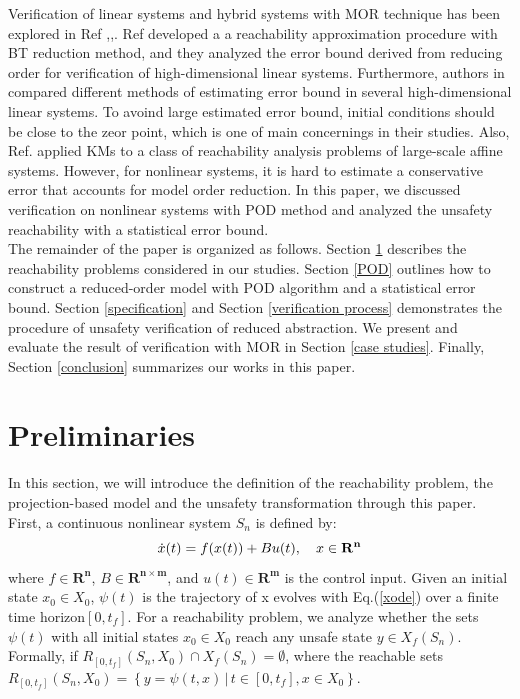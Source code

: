 \documentclass[runningheads,a4paper]{llncs}
\theoremstyle{definition}
\theoremstyle{plain}
\begin{document}
Verification of linear systems and hybrid systems with MOR technique has been explored in Ref \cite{1386733},\cite{Han2006},\cite{Tran2017}. Ref \cite{1386733} developed a a reachability approximation procedure with BT reduction method, and they analyzed the error bound derived from reducing order for verification of high-dimensional linear systems. Furthermore, authors in \cite{Tran2017} compared different methods of estimating error bound in several high-dimensional linear systems. To avoind large estimated error bound, initial conditions should be close to the zeor point, which is one of main concernings in their studies. Also, Ref.\cite{Han2006} applied KMs to a class of reachability analysis problems of large-scale affine systems. However, for nonlinear systems, it is hard to estimate a conservative error that accounts for model order reduction. In this paper, we discussed verification on nonlinear systems with POD method and analyzed the unsafety reachability with a statistical error bound.\\
The remainder of the paper is organized as follows. Section \ref{Preliminaries} describes the reachability problems considered in our studies. Section \ref{POD} outlines how to construct a reduced-order model with POD algorithm and a statistical error bound. Section \ref{specification} and Section \ref{verification process} demonstrates the procedure of unsafety verification of reduced abstraction. We present and evaluate the result of verification with MOR in Section \ref{case studies}. Finally, Section \ref{conclusion} summarizes our works in this paper.


\section{ Preliminaries} \label{Preliminaries}
In this section, we will introduce the definition of the reachability problem, the projection-based model and the unsafety transformation through this paper. First, a continuous nonlinear system $S_n$ is defined by: 
\begin{equation}
\dot{x}(t)=f(x(t))+Bu(t), \quad x \in \mathbf{R^n} \\ \label{xode} 
\end{equation}
where $f \in \mathbf{R^n}$, $B \in \mathbf{R^{n\times m}}$, and $u(t) \in \mathbf{R^m}$ is the control input. 
Given an initial state $x_0 \in X_0$, $\psi(t)$ is the trajectory of x evolves with Eq.(\ref{xode}) over a finite time horizon$ [0, t_f]$. For a reachability problem, we analyze whether the sets $\psi(t)$ with all initial states $x_0 \in X_0$ reach any unsafe state $y \in X_f(S_n)$. Formally, if $R_{[0,t_f]}(S_n,X_0) \cap X_f(S_n)=\emptyset $, where the reachable sets $R_{[0,t_f]}(S_n,X_0 ) = \left\{ {y=\psi(t,x) \, |\, t\in [0,t_f], x\in X_0}\right\}$. 
\end{document}
